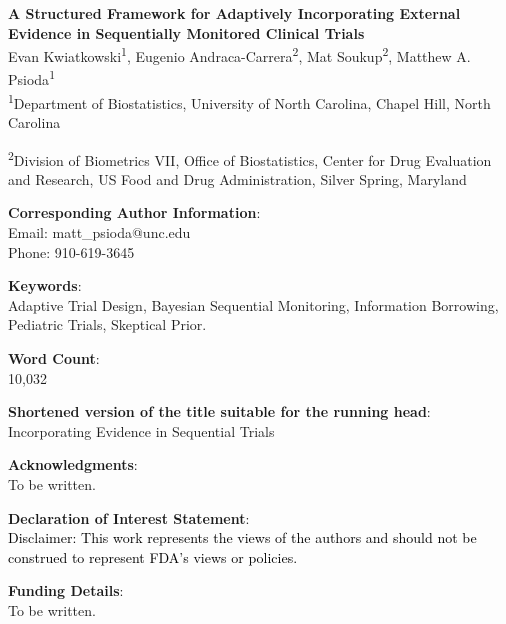 \documentclass[12pt]{article}
\begin{document}
	\begin{center}
		\textbf{A Structured Framework for Adaptively Incorporating External\\ 
		         Evidence in Sequentially Monitored Clinical Trials} \\

		\vspace{1cm}
			Evan Kwiatkowski\textsuperscript{1}, Eugenio Andraca-Carrera\textsuperscript{2}, 
			Mat Soukup\textsuperscript{2}, Matthew A. Psioda\textsuperscript{1}\\

		\vspace{1cm}
			\textsuperscript{1}{Department of Biostatistics, University of North Carolina, Chapel Hill, North Carolina}

		\vspace{1cm}
			\textsuperscript{2}{Division of Biometrics VII, Office of Biostatistics, Center for Drug Evaluation and Research, US Food and Drug Administration, Silver Spring, Maryland}
	\end{center}

\vspace{1cm}
\noindent
\textbf{Corresponding Author Information}: \\
Email: matt\_psioda@unc.edu \\
Phone: 910-619-3645

\vspace{1cm}
\noindent
\textbf{Keywords}: \\
Adaptive Trial Design, Bayesian Sequential Monitoring, Information Borrowing, Pediatric Trials, Skeptical Prior.

\vspace{1cm}
\noindent
\textbf{Word Count}: \\
10,032

\vspace{1cm}
\noindent
\textbf{Shortened version of the title suitable for the running head}: \\
Incorporating Evidence in Sequential Trials


\vspace{1cm}
\noindent
\textbf{Acknowledgments}: \\
To be written.

\vspace{1cm}
\noindent
\textbf{Declaration of Interest Statement}: \\
\textcolor{black}{Disclaimer: This work represents the views of the authors and should not be construed to represent FDA's views or policies.}


\vspace{1cm}
\noindent
\textbf{Funding Details}: \\
To be written.
\end{document}
